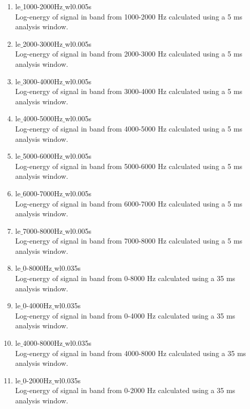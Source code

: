 \documentclass[12pt]{article}
\begin{document}
\begin{enumerate}
    \item le$\_$1000-2000Hz$\_$wl0.005s \\
      Log-energy of signal in band from 1000-2000 Hz calculated using a 5 ms analysis window.

    \item le$\_$2000-3000Hz$\_$wl0.005s \\
      Log-energy of signal in band from 2000-3000 Hz calculated using a 5 ms analysis window.

    \item le$\_$3000-4000Hz$\_$wl0.005s \\
      Log-energy of signal in band from 3000-4000 Hz calculated using a 5 ms analysis window.

    \item le$\_$4000-5000Hz$\_$wl0.005s \\
      Log-energy of signal in band from 4000-5000 Hz calculated using a 5 ms analysis window.

    \item le$\_$5000-6000Hz$\_$wl0.005s \\
      Log-energy of signal in band from 5000-6000 Hz calculated using a 5 ms analysis window.

    \item le$\_$6000-7000Hz$\_$wl0.005s \\
      Log-energy of signal in band from 6000-7000 Hz calculated using a 5 ms analysis window.

    \item le$\_$7000-8000Hz$\_$wl0.005s \\
      Log-energy of signal in band from 7000-8000 Hz calculated using a 5 ms analysis window.

    \item le$\_$0-8000Hz$\_$wl0.035s \\
      Log-energy of signal in band from 0-8000 Hz calculated using a 35 ms analysis window.

    \item le$\_$0-4000Hz$\_$wl0.035s \\
      Log-energy of signal in band from 0-4000 Hz calculated using a 35 ms analysis window.

    \item le$\_$4000-8000Hz$\_$wl0.035s \\
      Log-energy of signal in band from 4000-8000 Hz calculated using a 35 ms analysis window.

    \item le$\_$0-2000Hz$\_$wl0.035s \\
      Log-energy of signal in band from 0-2000 Hz calculated using a 35 ms analysis window.


\end{enumerate}
\end{document}
